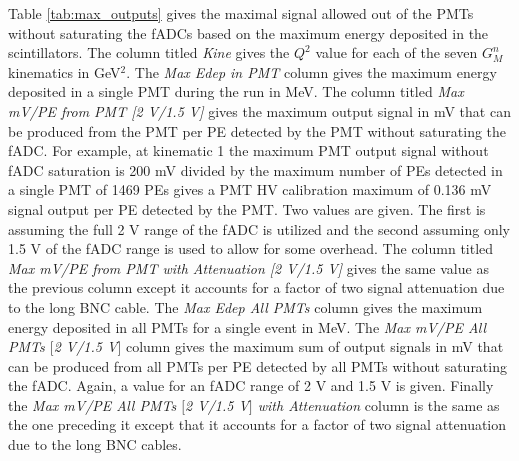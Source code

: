 \documentclass[10pt]{article}
\begin{document}
	Table \ref{tab:max_outputs} gives the maximal signal allowed out of the PMTs without saturating the fADCs based on the maximum energy deposited in the scintillators. The column titled \textit{Kine} gives the $Q^2$ value for each of the seven $G_M^n$ kinematics in GeV$^2$. The \textit{Max Edep in PMT} column gives the maximum energy deposited in a single PMT during the run in MeV. The column titled \textit{Max mV/PE from PMT [2 V/1.5 V]} gives the maximum output signal in mV that can be produced from the PMT per PE detected by the PMT without saturating the fADC. For example, at kinematic 1 the maximum PMT output signal without fADC saturation is 200 mV divided by the maximum number of PEs detected in a single PMT of 1469 PEs gives a PMT HV calibration maximum of 0.136 mV signal output per PE detected by the PMT.  Two values are given. The first is assuming the full 2 V range of the fADC is utilized and the second assuming only 1.5 V of the fADC range is used to allow for some overhead. The column titled \textit{Max mV/PE from PMT with Attenuation [2 V/1.5 V]} gives the same value as the previous column except it accounts for a factor of two signal attenuation due to the long BNC cable. The \textit{Max Edep All PMTs} column gives the maximum energy deposited in all PMTs for a single event in MeV. The \textit{Max mV/PE All PMTs $[$2 V/1.5 V$]$} column gives the maximum sum of output signals in mV that can be produced from all PMTs per PE detected by all PMTs without saturating the fADC. Again, a value for an fADC range of 2 V and 1.5 V is given. Finally the \textit{Max mV/PE All PMTs $[$2 V/1.5 V$]$ with Attenuation} column is the same as the one preceding it except that it accounts for a factor of two signal attenuation due to the long BNC cables.
	
\end{document}
